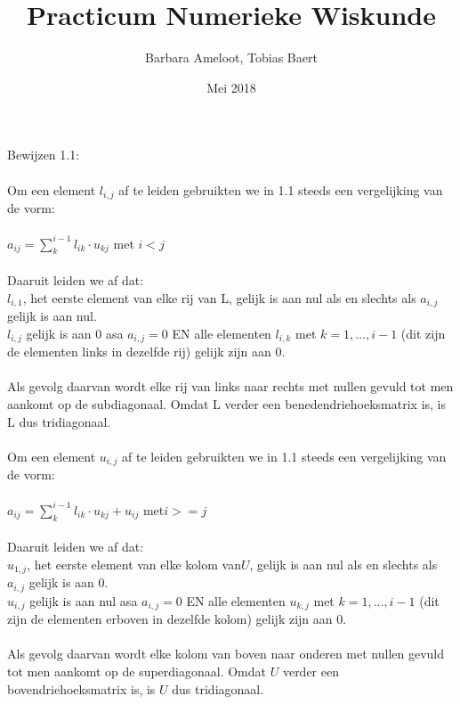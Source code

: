 \documentclass[a4paper]{article}
\title{Practicum Numerieke Wiskunde}
\author{Barbara Ameloot, Tobias Baert}
\date{Mei 2018}
\begin{document}
\maketitle
Bewijzen 1.1:
\\{}
\\Om een element  $l_{i,j}$ af te leiden gebruikten we in 1.1 steeds een vergelijking van de vorm:
\\{}
\\$a_{ij} = \sum_k^{i-1} {l_{ik}\cdot u_{kj}}$ met $ i < j$ 
\\{}
\\Daaruit leiden we af dat:
\\ \textbullet{ } $l_{i,1}$, het eerste element van elke rij van L, gelijk is aan nul als en slechts als $a_{i,j}$ gelijk is aan nul.
\\ \textbullet { } $ l_{i,j}$ gelijk is aan 0 asa $a_{i,j} = 0$ EN alle elementen $l_{i,k}$ met $k = 1, ..., i - 1$ (dit zijn de elementen links in dezelfde rij) gelijk zijn aan 0.
\\{}
\\Als gevolg daarvan wordt elke rij van links naar rechts met nullen gevuld tot men aankomt op de subdiagonaal. Omdat L verder een benedendriehoeksmatrix is, is L dus tridiagonaal.
\\{}
\\Om een element $u_{i,j}$ af te leiden gebruikten we in 1.1 steeds een vergelijking van de vorm:
\\{}
\\$a_{ij} = \sum_k^{i-1} {l_{ik}\cdot u_{kj}} + u_{ij}$ met$ i >= j $
\\{}
\\Daaruit leiden we af dat:
\\ \textbullet{ } $u_{1,j}$, het eerste element van elke kolom van$ U$, gelijk is aan nul als en slechts als $a_{i,j}$ gelijk is aan 0.
\\ \textbullet{ } $u_{i,j}$ gelijk is aan nul asa $a_{i,j} = 0$ EN alle elementen $u_{k,j}$ met $k = 1, ..., i - 1$ (dit zijn de elementen erboven in dezelfde kolom) gelijk zijn aan 0.
\\{}
\\Als gevolg daarvan wordt elke kolom van boven naar onderen met nullen gevuld tot men aankomt op de superdiagonaal. Omdat $U$ verder een bovendriehoeksmatrix is, is $U$ dus tridiagonaal.
\end{document}

